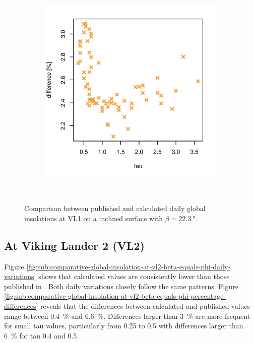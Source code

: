 \begin{figure}[H]
\begin{subfigure}[t]{\subfigureWidth}
            \label{fig:sub:comparative-global-insolation-at-vl1-beta-equals-phi-daily-variations}
    \end{subfigure}\hfill
    \begin{subfigure}[t]{\subfigureWidth}
        \centering
            \includegraphics[height=\graphicsHeight]{sections/appendix/A/plots/h-diff-bet-exp-calc-at-vl1-with-beta-223-deg.png}
            \label{fig:sub:comparative-global-insolation-at-vl1-beta-equals-phi-percentage-differences}
    \end{subfigure}\\[0.8ex]
    \caption{Comparison between published and calculated daily global insolations at \ac{VL1} on a inclined surface with $\beta=\SI{22.3}{\degree}$.}
    \label{fig:plot:comparative-global-insolation-at-vl1-beta-equals-phi}
\vspace{-2ex}
\end{figure}

\subsection{At Viking Lander 2 (VL2)}
Figure \ref{fig:sub:comparative-global-insolation-at-vl2-beta-equals-phi-daily-variations} shows that calculated values are consistently lower than those published in . Both daily variations closely follow the same patterns. Figure \ref{fig:sub:comparative-global-insolation-at-vl2-beta-equals-phi-percentage-differences} reveals that the differences between calculated and published values range between \SI{0.4}{\percent} and \SI{6.6}{\percent}. Differences larger than \SI{3}{\percent} are more frequent for small tau values, particularly from 0.25 to 0.5 with differences larger than \SI{6}{\percent} for tau 0.4 and 0.5.

